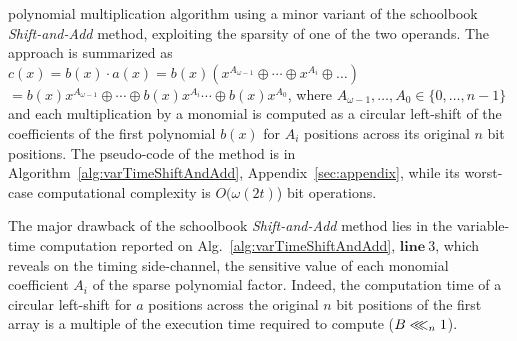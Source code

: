polynomial multiplication algorithm using a minor variant of the schoolbook
\textit{Shift-and-Add} method, exploiting the sparsity of one of the two 
operands.
The approach is summarized as $c(x) = b(x) \cdot a(x) = b(x) (x^{A_{\omega-1}}\oplus\cdots \oplus x^{A_{i}}\oplus\ldots)$ $= b(x)x^{A_{\omega-1}} \oplus \cdots\oplus b(x)x^{A_{i}} \cdots\oplus b(x)x^{A_{0}}$, where $A_{\omega-1},\ldots, A_{0} \in \{0,\ldots ,n-1\}$ 
and each multiplication by a monomial is computed as a circular left-shift of 
the coefficients of the first polynomial $b(x)$ for $A_i$ positions across its 
original $n$ bit positions. 
The pseudo-code of the method is in Algorithm~\ref{alg:varTimeShiftAndAdd}, Appendix~\ref{sec:appendix}, while its worst-case computational 
complexity is ${O}(\omega(2t)$) bit operations.

The major drawback of the schoolbook \textit{Shift-and-Add} method lies in the 
variable-time computation reported on Alg.~\ref{alg:varTimeShiftAndAdd}, 
$\mathbf{line}\ 3$, which reveals on the timing side-channel, the sensitive 
value of each monomial coefficient $A_i$ of the sparse polynomial factor. 
Indeed, the computation time of a circular left-shift for $a$ positions across 
the original $n$ bit positions of the first array is a multiple of the execution 
time required to compute ($B \lll_n 1$).         
% 
